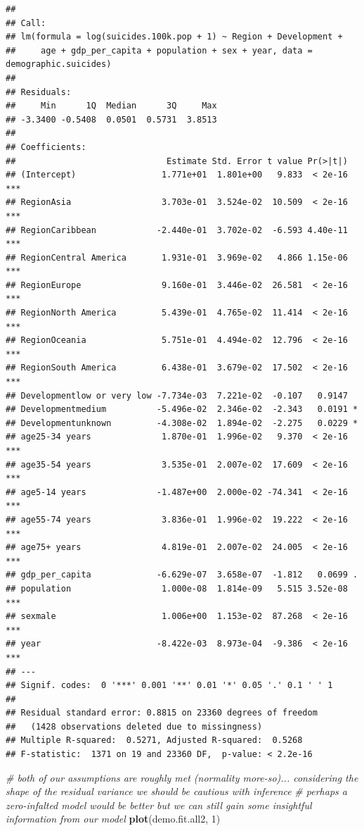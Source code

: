 \documentclass[11pt,]{article}
\newenvironment{Shaded}{\begin{snugshade}}{\end{snugshade}}
\newcommand{\CommentTok}[1]{\textcolor[rgb]{0.56,0.35,0.01}{\textit{#1}}}
\newcommand{\DecValTok}[1]{\textcolor[rgb]{0.00,0.00,0.81}{#1}}
\newcommand{\KeywordTok}[1]{\textcolor[rgb]{0.13,0.29,0.53}{\textbf{#1}}}
\newcommand{\NormalTok}[1]{#1}
\begin{document}
\begin{verbatim}
## 
## Call:
## lm(formula = log(suicides.100k.pop + 1) ~ Region + Development + 
##     age + gdp_per_capita + population + sex + year, data = demographic.suicides)
## 
## Residuals:
##     Min      1Q  Median      3Q     Max 
## -3.3400 -0.5408  0.0501  0.5731  3.8513 
## 
## Coefficients:
##                              Estimate Std. Error t value Pr(>|t|)    
## (Intercept)                 1.771e+01  1.801e+00   9.833  < 2e-16 ***
## RegionAsia                  3.703e-01  3.524e-02  10.509  < 2e-16 ***
## RegionCaribbean            -2.440e-01  3.702e-02  -6.593 4.40e-11 ***
## RegionCentral America       1.931e-01  3.969e-02   4.866 1.15e-06 ***
## RegionEurope                9.160e-01  3.446e-02  26.581  < 2e-16 ***
## RegionNorth America         5.439e-01  4.765e-02  11.414  < 2e-16 ***
## RegionOceania               5.751e-01  4.494e-02  12.796  < 2e-16 ***
## RegionSouth America         6.438e-01  3.679e-02  17.502  < 2e-16 ***
## Developmentlow or very low -7.734e-03  7.221e-02  -0.107   0.9147    
## Developmentmedium          -5.496e-02  2.346e-02  -2.343   0.0191 *  
## Developmentunknown         -4.308e-02  1.894e-02  -2.275   0.0229 *  
## age25-34 years              1.870e-01  1.996e-02   9.370  < 2e-16 ***
## age35-54 years              3.535e-01  2.007e-02  17.609  < 2e-16 ***
## age5-14 years              -1.487e+00  2.000e-02 -74.341  < 2e-16 ***
## age55-74 years              3.836e-01  1.996e-02  19.222  < 2e-16 ***
## age75+ years                4.819e-01  2.007e-02  24.005  < 2e-16 ***
## gdp_per_capita             -6.629e-07  3.658e-07  -1.812   0.0699 .  
## population                  1.000e-08  1.814e-09   5.515 3.52e-08 ***
## sexmale                     1.006e+00  1.153e-02  87.268  < 2e-16 ***
## year                       -8.422e-03  8.973e-04  -9.386  < 2e-16 ***
## ---
## Signif. codes:  0 '***' 0.001 '**' 0.01 '*' 0.05 '.' 0.1 ' ' 1
## 
## Residual standard error: 0.8815 on 23360 degrees of freedom
##   (1428 observations deleted due to missingness)
## Multiple R-squared:  0.5271, Adjusted R-squared:  0.5268 
## F-statistic:  1371 on 19 and 23360 DF,  p-value: < 2.2e-16
\end{verbatim}

\begin{Shaded}
\begin{Highlighting}[]
\CommentTok{# both of our assumptions are roughly met (normality more-so)... considering the shape of the residual variance we should be cautious with inference}
\CommentTok{# perhaps a zero-infalted model would be better but we can still gain some insightful information from our model}
\KeywordTok{plot}\NormalTok{(demo.fit.all2, }\DecValTok{1}\NormalTok{)}
\end{Highlighting}
\end{Shaded}
\end{document}
